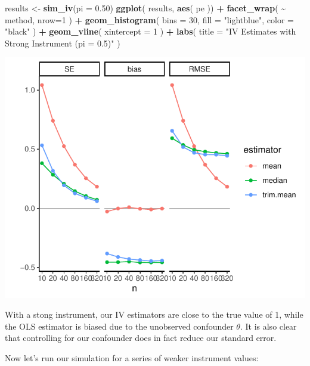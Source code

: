 \documentclass[
]{book}
\newenvironment{Shaded}{\begin{snugshade}}{\end{snugshade}}
\newcommand{\AttributeTok}[1]{\textcolor[rgb]{0.13,0.29,0.53}{#1}}
\newcommand{\DecValTok}[1]{\textcolor[rgb]{0.00,0.00,0.81}{#1}}
\newcommand{\FloatTok}[1]{\textcolor[rgb]{0.00,0.00,0.81}{#1}}
\newcommand{\FunctionTok}[1]{\textcolor[rgb]{0.13,0.29,0.53}{\textbf{#1}}}
\newcommand{\NormalTok}[1]{#1}
\newcommand{\OtherTok}[1]{\textcolor[rgb]{0.56,0.35,0.01}{#1}}
\newcommand{\SpecialCharTok}[1]{\textcolor[rgb]{0.81,0.36,0.00}{\textbf{#1}}}
\newcommand{\StringTok}[1]{\textcolor[rgb]{0.31,0.60,0.02}{#1}}
\begin{document}
\begin{Shaded}
\begin{Highlighting}[]
\NormalTok{results }\OtherTok{\textless{}{-}} \FunctionTok{sim\_iv}\NormalTok{(}\AttributeTok{pi =} \FloatTok{0.50}\NormalTok{)}
\FunctionTok{ggplot}\NormalTok{( results, }\FunctionTok{aes}\NormalTok{( pe )) }\SpecialCharTok{+}
  \FunctionTok{facet\_wrap}\NormalTok{( }\SpecialCharTok{\textasciitilde{}}\NormalTok{ method, }\AttributeTok{nrow=}\DecValTok{1}\NormalTok{ ) }\SpecialCharTok{+}
  \FunctionTok{geom\_histogram}\NormalTok{( }\AttributeTok{bins =} \DecValTok{30}\NormalTok{, }\AttributeTok{fill =} \StringTok{"lightblue"}\NormalTok{, }\AttributeTok{color =} \StringTok{"black"}\NormalTok{ ) }\SpecialCharTok{+}
  \FunctionTok{geom\_vline}\NormalTok{( }\AttributeTok{xintercept =} \DecValTok{1}\NormalTok{ ) }\SpecialCharTok{+}
  \FunctionTok{labs}\NormalTok{( }\AttributeTok{title =} \StringTok{"IV Estimates with Strong Instrument (pi = 0.5)"}\NormalTok{ )}
\end{Highlighting}
\end{Shaded}

\begin{center}\includegraphics[width=0.75\linewidth]{Designing-Simulations-in-R_files/figure-latex/unnamed-chunk-172-1} \end{center}

With a stong instrument, our IV estimators are close to the true value of 1, while the OLS estimator is biased due to the unobserved confounder \(\theta\).
It is also clear that controlling for our confounder does in fact reduce our standard error.

Now let's run our simulation for a series of weaker instrument values:
\end{document}
